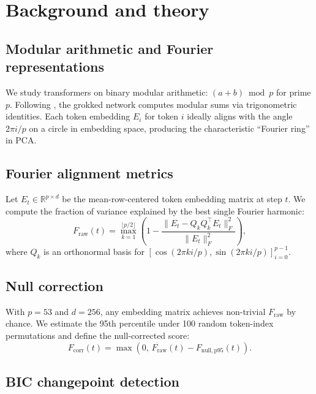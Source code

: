 \documentclass[12pt,openany,a4paper]{book}
\newcommand{\fcorr}{F_{\mathrm{corr}}}
\begin{document}
\chapter{Background and theory}
\label{ch:background}

\section{Modular arithmetic and Fourier representations}

We study transformers on binary modular arithmetic: $(a+b) \bmod p$ for prime $p$. Following \citet{nanda2023progress}, the grokked network computes modular sums via trigonometric identities. Each token embedding $E_i$ for token $i$ ideally aligns with the angle $2\pi i / p$ on a circle in embedding space, producing the characteristic ``Fourier ring'' in PCA.

\section{Fourier alignment metrics}

Let $E_t \in \mathbb{R}^{p \times d}$ be the mean-row-centered token embedding matrix at step $t$. We compute the fraction of variance explained by the best single Fourier harmonic:
\begin{equation}
  F_{\mathrm{raw}}(t) = \max_{k=1}^{\lfloor p/2\rfloor}
  \left(1 - \frac{\|E_t - Q_k Q_k^\top E_t\|_F^2}
  {\|E_t\|_F^2}\right),
  \label{eq:f_raw}
\end{equation}
where $Q_k$ is an orthonormal basis for $[\cos(2\pi ki/p), \sin(2\pi ki/p)]_{i=0}^{p-1}$.

\section{Null correction}

With $p=53$ and $d=256$, any embedding matrix achieves non-trivial $F_{\mathrm{raw}}$ by chance. We estimate the 95th percentile under 100 random token-index permutations and define the null-corrected score:
\begin{equation}
  \fcorr(t) = \max(0,\, F_{\mathrm{raw}}(t) - F_{\mathrm{null,p95}}(t)).
\end{equation}

\section{BIC changepoint detection}
\end{document}
